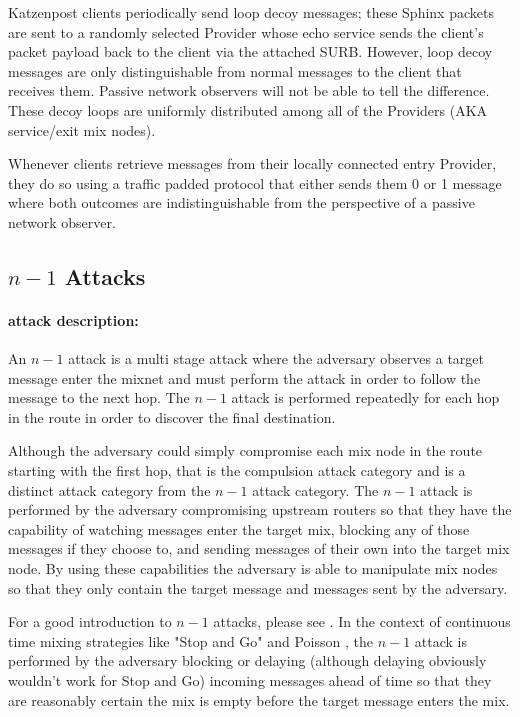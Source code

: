 \documentclass{article}
\begin{document}
Katzenpost clients periodically send loop decoy messages; these Sphinx packets are sent to a randomly
selected Provider whose echo service sends the client's packet payload back to the client via
the attached SURB. However, loop decoy messages are only distinguishable from normal messages to
the client that receives them. Passive network observers will not be able to tell the difference.
These decoy loops are uniformly distributed among all of the Providers (AKA service/exit mix nodes).

Whenever clients retrieve messages from their locally connected entry Provider, they do so using a
traffic padded protocol that either sends them 0 or 1 message where both outcomes are indistinguishable from the
perspective of a passive network observer.


\pagebreak

\subsection{$n-1$ Attacks}

\paragraph{attack description:} An $n-1$ attack is a multi stage attack where the adversary observes a target message enter the mixnet
and must perform the attack in order to follow the message to the next hop. The $n-1$ attack is performed repeatedly for each hop in the route
in order to discover the final destination.

Although the adversary could simply compromise each mix node in the route starting with the first hop, that is the compulsion attack category
and is a distinct attack category from the $n-1$ attack category. The $n-1$ attack is performed by the adversary compromising upstream routers so that they have the capability
of watching messages enter the target mix, blocking any of those messages if they choose to, and sending messages of their own into the target mix node.
By using these capabilities the adversary is able to manipulate mix nodes so that they only contain the target message and messages sent by the adversary.

For a good introduction to $n-1$ attacks, please see . In the context of continuous time mixing
strategies like "Stop and Go"  and Poisson , the $n-1$ attack is performed by the adversary blocking or delaying
(although delaying obviously wouldn't work for Stop and Go) incoming messages ahead of time
so that they are reasonably certain the mix is empty before the target message enters the mix.
\end{document}
